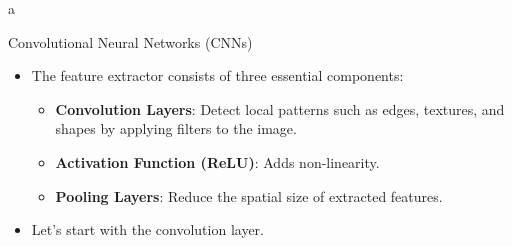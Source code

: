a\documentclass[10pt]{beamer}
\theoremstyle{remark}
\theoremstyle{definition}
\begin{document}
\framebreak

\begin{frame}{Convolutional Neural Networks (CNNs)}
\begin{itemize}
    \item The feature extractor consists of three essential components:
    \begin{itemize}
        \item \textbf{Convolution Layers}: Detect local patterns such as edges, textures, and shapes by applying filters to the image.
        \item \textbf{Activation Function (ReLU)}: Adds non-linearity.
        \item \textbf{Pooling Layers}: Reduce the spatial size of extracted features.
    \end{itemize}
    \item Let's start with the convolution layer.
\end{itemize}

\end{frame}

\framebreak
\end{document}
